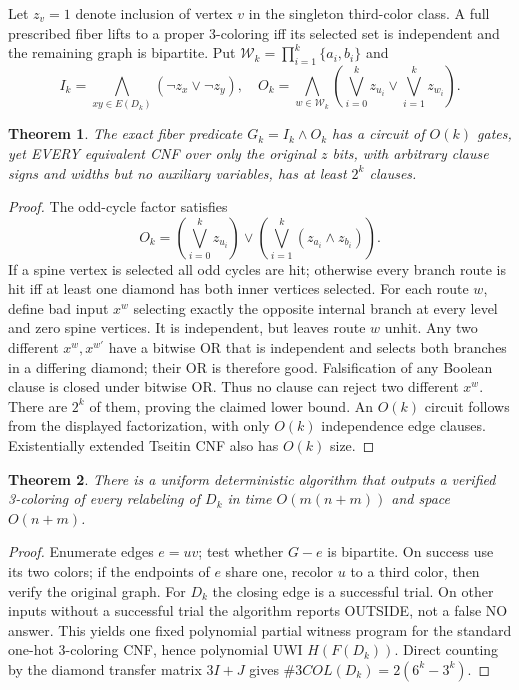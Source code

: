 \documentclass{article}
\newtheorem{theorem}{Theorem}
\begin{document}
Let $z_v=1$ denote inclusion of vertex $v$ in the singleton third-color class. A full prescribed fiber lifts to a proper 3-coloring iff its selected set is independent and the remaining graph is bipartite. Put $\mathscr W_k=\prod_{i=1}^k\{a_i,b_i\}$ and
\[
 I_k=\bigwedge_{xy\in E(D_k)}(\neg z_x\vee\neg z_y),\quad
 O_k=\bigwedge_{w\in\mathscr W_k}
 \left(\bigvee_{i=0}^kz_{u_i}\vee\bigvee_{i=1}^kz_{w_i}\right).
\]
\begin{theorem}
The exact fiber predicate $G_k=I_k\land O_k$ has a circuit of $O(k)$ gates, yet EVERY equivalent CNF over only the original $z$ bits, with arbitrary clause signs and widths but no auxiliary variables, has at least $2^k$ clauses.
\end{theorem}
\begin{proof}
The odd-cycle factor satisfies
\[
O_k=\left(\bigvee_{i=0}^kz_{u_i}\right)\vee
\left(\bigvee_{i=1}^k(z_{a_i}\wedge z_{b_i})\right).
\]
If a spine vertex is selected all odd cycles are hit; otherwise every branch route is hit iff at least one diamond has both inner vertices selected. For each route $w$, define bad input $x^w$ selecting exactly the opposite internal branch at every level and zero spine vertices. It is independent, but leaves route $w$ unhit. Any two different $x^w,x^{w'}$ have a bitwise OR that is independent and selects both branches in a differing diamond; their OR is therefore good. Falsification of any Boolean clause is closed under bitwise OR. Thus no clause can reject two different $x^w$. There are $2^k$ of them, proving the claimed lower bound. An $O(k)$ circuit follows from the displayed factorization, with only $O(k)$ independence edge clauses. Existentially extended Tseitin CNF also has $O(k)$ size.
\end{proof}

\begin{theorem}
There is a uniform deterministic algorithm that outputs a verified 3-coloring of every relabeling of $D_k$ in time $O(m(n+m))$ and space $O(n+m)$.
\end{theorem}
\begin{proof}
Enumerate edges $e=uv$; test whether $G-e$ is bipartite. On success use its two colors; if the endpoints of $e$ share one, recolor $u$ to a third color, then verify the original graph. For $D_k$ the closing edge is a successful trial. On other inputs without a successful trial the algorithm reports OUTSIDE, not a false NO answer. This yields one fixed polynomial partial witness program for the standard one-hot 3-coloring CNF, hence polynomial UWI $H(F(D_k))$. Direct counting by the diamond transfer matrix $3I+J$ gives $\#3COL(D_k)=2(6^k-3^k)$.
\end{proof}
\end{document}
